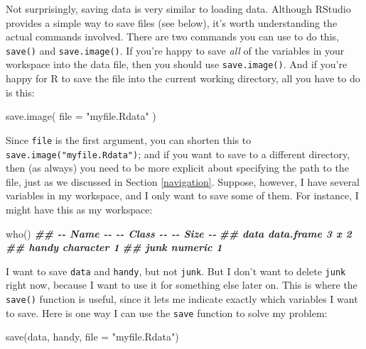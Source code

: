 \documentclass[
]{book}
\newenvironment{Shaded}{\begin{snugshade}}{\end{snugshade}}
\newcommand{\AttributeTok}[1]{\textcolor[rgb]{0.77,0.63,0.00}{#1}}
\newcommand{\DocumentationTok}[1]{\textcolor[rgb]{0.56,0.35,0.01}{\textbf{\textit{#1}}}}
\newcommand{\FunctionTok}[1]{\textcolor[rgb]{0.00,0.00,0.00}{#1}}
\newcommand{\NormalTok}[1]{#1}
\newcommand{\StringTok}[1]{\textcolor[rgb]{0.31,0.60,0.02}{#1}}
\begin{document}
Not surprisingly, saving data is very similar to loading data. Although RStudio provides a simple way to save files (see below), it's worth understanding the actual commands involved. There are two commands you can use to do this, \texttt{save()} and \texttt{save.image()}. If you're happy to save \emph{all} of the variables in your workspace into the data file, then you should use \texttt{save.image()}. And if you're happy for R to save the file into the current working directory, all you have to do is this:

\begin{Shaded}
\begin{Highlighting}[]
\FunctionTok{save.image}\NormalTok{( }\AttributeTok{file =} \StringTok{"myfile.Rdata"}\NormalTok{ )}
\end{Highlighting}
\end{Shaded}

Since \texttt{file} is the first argument, you can shorten this to \texttt{save.image("myfile.Rdata")}; and if you want to save to a different directory, then (as always) you need to be more explicit about specifying the path to the file, just as we discussed in Section \ref{navigation}. Suppose, however, I have several variables in my workspace, and I only want to save some of them. For instance, I might have this as my workspace:

\begin{Shaded}
\begin{Highlighting}[]
\FunctionTok{who}\NormalTok{()}
\DocumentationTok{\#\#   {-}{-} Name {-}{-}   {-}{-} Class {-}{-}   {-}{-} Size {-}{-}}
\DocumentationTok{\#\#   data         data.frame    3 x 2     }
\DocumentationTok{\#\#   handy        character     1         }
\DocumentationTok{\#\#   junk         numeric       1        }
\end{Highlighting}
\end{Shaded}

I want to save \texttt{data} and \texttt{handy}, but not \texttt{junk}. But I don't want to delete \texttt{junk} right now, because I want to use it for something else later on. This is where the \texttt{save()} function is useful, since it lets me indicate exactly which variables I want to save. Here is one way I can use the \texttt{save} function to solve my problem:

\begin{Shaded}
\begin{Highlighting}[]
\FunctionTok{save}\NormalTok{(data, handy, }\AttributeTok{file =} \StringTok{"myfile.Rdata"}\NormalTok{)}
\end{Highlighting}
\end{Shaded}
\end{document}
